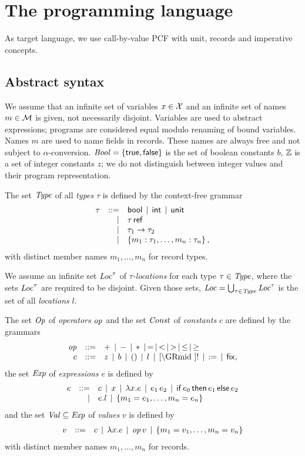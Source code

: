 \documentclass[12pt,a4paper]{report}
\begin{document}

\chapter{The programming language}

As target language, we use call-by-value PCF with unit, records and imperative concepts.



\section{Abstract syntax}

We assume that an infinite set of variables $x \in \mathcal{X}$ and an infinite
set of names $m\in \mathcal{M}$ is given, not necessarily disjoint.
Variables are used to abstract expressions; programs are considered equal modulo
renaming of bound variables. Names $m$ are used to name fields in records. These
names are always free and not subject to $\alpha$-conversion.
$\mathit{Bool} = \{\mathsf{true},\mathsf{false}\}$ is the set of boolean constants $b$,
$\mathbb Z$ is a set of integer constants $z$; we do not distinguish
between integer values and their program representation.

\begin{definition}[Types]
  The set $\mathit{Type}$ of all {\em types} $\tau$ is defined by the context-free grammar
  \[\begin{array}{rrlll}
  \tau & ::= & \mathsf{bool} \,\mid\, \mathsf{int} \,\mid\, \mathsf{unit}
          \\ & \mid & \tau\,\mathsf{ref}
          \\ & \mid & \tau_1\to\tau_2
          \\ & \mid & \left\{m_1:\tau_1,\ldots,m_n:\tau_n\right\},
  \end{array}\]
  with distinct member names $m_1,\ldots,m_n$ for record types.
\end{definition}

We assume an infinite set $\mathit{Loc}^\tau$ of {\em $\tau$-locations} for each type $\tau \in \mathit{Type}$,
where the sets $\mathit{Loc}^\tau$ are required to be disjoint. Given those sets,
$\mathit{Loc} = \bigcup_{\tau\in\mathit{Type}} \mathit{Loc}^\tau$ is the set of all {\em locations} $l$.

\begin{definition}[Expressions]
  The set $\mathit{Op}$ of {\em operators} $\mathit{op}$ and the set $\mathit{Const}$ of {\em constants} $c$
  are defined by the grammars
  \[\GRbeg
    \op \GRis + \GRmid - \GRmid * \GRmid = \GRmid < \GRmid > \GRmid \le \GRmid \ge \\
    c \GRis z \GRmid b \GRmid \unit \GRmid l \GRmid \cref \GRmid !
             \GRmid \assign \GRmid \fix,
  \GRend\]
  the set $\mathit{Exp}$ of {\em expressions} $e$ is defined by
  \[\begin{array}{rrlll}
    e & ::= & c \,\mid\, x \,\mid\, \lambda x.e \,\mid\, e_1\,e_2
           \,\mid\, \mathsf{if}\,e_0\,\mathsf{then}\,e_1\,\mathsf{else}\,e_2
           \\ & \mid & e.l \,\mid\, \left\{m_1=e_1,\ldots,m_n=e_n\right\}
  \end{array}\]
  and the set $\mathit{Val} \subseteq \mathit{Exp}$ of {\em values} $v$ is defined by
  \[\begin{array}{rrlll}
    v & ::= & c \,\mid\, \lambda x.e \,\mid\, \mathit{op}\,v \,\mid\, \left\{m_1=v_1,\ldots,m_n=v_n\right\}
  \end{array}\]
  with distinct member names $m_1,\ldots,m_n$ for records.
\end{definition}
\end{document}
